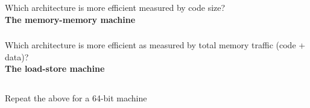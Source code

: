 \documentclass{article}
\begin{document}
\subsubsection{}
Which architecture is more efficient measured by code size?\\
\textbf{The memory-memory machine}
\subsubsection{}
Which architecture is more efficient as measured by total memory traffic (code + data)?\\
\textbf{The load-store machine}
\subsection{}
Repeat the above for a 64-bit machine 
\end{document}
